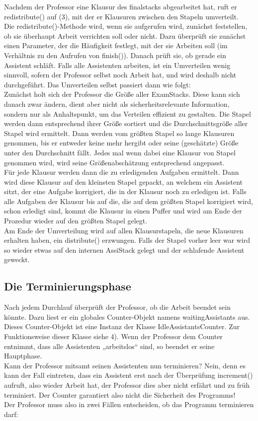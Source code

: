\documentclass[12pt,a4paper]{article}
\begin{document}
Nachdem der Professor eine Klausur des finalstacks abgearbeitet hat, ruft er redistribute() auf (3), mit der er Klausuren zwischen den Stapeln umverteilt. \\
Die redistribute()-Methode wird, wenn sie aufgerufen wird, zunächst feststellen, ob sie überhaupt Arbeit verrichten soll oder nicht. Dazu überprüft sie zunächst einen Parameter, der die Häufigkeit festlegt, mit der sie Arbeiten soll (im Verhältnis zu den Aufrufen von finish()). Danach prüft sie, ob gerade ein Assistent schläft. Falls alle Assistenten arbeiten, ist ein Umverteilen wenig sinnvoll, sofern der Professor selbst noch Arbeit hat, und wird deshalb nicht durchgeführt.
Das Umverteilen selbst passiert dann wie folgt:\\
Zunächst holt sich der Professor die Größe aller ExamStacks. Diese kann sich danach zwar ändern, dient aber nicht als sicherheitsrelevante Information, sondern nur als Anhaltspunkt, um das Verteilen effizient zu gestalten. Die Stapel werden dann entsprechend ihrer Größe sortiert und die Durchschnittsgröße aller Stapel wird ermittelt. Dann werden vom größten Stapel so lange Klausuren genommen, bis er entweder keine mehr hergibt oder seine (geschätzte) Größe unter den Durchschnitt fällt. Jedes mal wenn dabei eine Klausur von Stapel genommen wird, wird seine Größenabschätzung entsprechend angepasst.\\
Für jede Klausur werden dann die zu erledigenden Aufgaben ermittelt. Dann wird diese Klausur auf den kleinsten Stapel gepackt, an welchem ein Assistent sitzt, der eine Aufgabe korrigiert, die in der Klausur noch zu erledigen ist. Falls alle Aufgaben der Klausur bis auf die, die auf dem größten Stapel korrigiert wird, schon erledigt sind, kommt die Klausur in einen Puffer und wird am Ende der Prozedur wieder auf den größten Stapel gelegt.\\
Am Ende der Umverteilung wird auf allen Klausurstapeln, die neue Klausuren erhalten haben, ein distribute() erzwungen. Falls der Stapel vorher leer war wird so wieder etwas auf den internen AssiStack gelegt und der schlafende Assistent geweckt.

\subsection{Die Terminierungsphase}

Nach jedem Durchlauf überprüft der Professor, ob die Arbeit beendet sein könnte. Dazu liest er ein globales Counter-Objekt namens waitingAssistants aus. Dieses Counter-Objekt ist eine Instanz der Klasse IdleAssistantsCounter. Zur Funktionsweise dieser Klasse siehe 4). Wenn der Professor dem Counter entnimmt, dass alle Assistenten „arbeitslos“ sind, so beendet er seine Hauptphase.\\ 
Kann der Professor mitsamt seinen Assistenten nun terminieren? Nein, denn es kann der Fall eintreten, dass ein Assistent erst nach der Überprüfung increment() aufruft, also wieder Arbeit hat, der Professor dies aber nicht erfährt und zu früh terminiert. Der Counter garantiert also nicht die Sicherheit des Programms!\\ 
Der Professor muss also in zwei Fällen entscheiden, ob das Programm terminieren darf:\\
\end{document}
